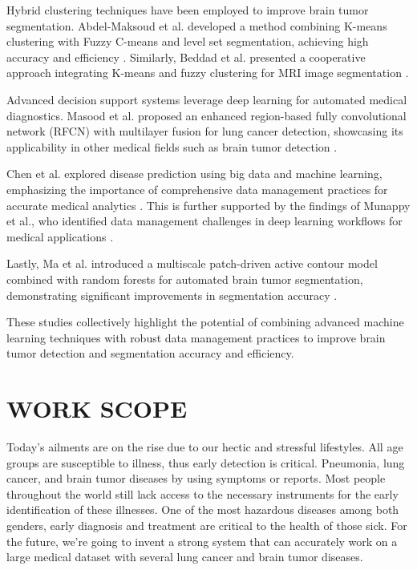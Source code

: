 \documentclass[conference]{IEEEtran}
\begin{document}
Hybrid clustering techniques have been employed to improve brain tumor segmentation. Abdel-Maksoud et al. developed a method combining K-means clustering with Fuzzy C-means and level set segmentation, achieving high accuracy and efficiency \cite{ABDELMAKSOUD201571-51}. Similarly, Beddad et al. presented a cooperative approach integrating K-means and fuzzy clustering for MRI image segmentation \cite{dattaad:10.1504}.

Advanced decision support systems leverage deep learning for automated medical diagnostics. Masood et al. proposed an enhanced region-based fully convolutional network (RFCN) with multilayer fusion for lung cancer detection, showcasing its applicability in other medical fields such as brain tumor detection \cite{masood900}. 

Chen et al. explored disease prediction using big data and machine learning, emphasizing the importance of comprehensive data management practices for accurate medical analytics \cite{chen791-53}. This is further supported by the findings of Munappy et al., who identified data management challenges in deep learning workflows for medical applications \cite{munppy89-16}.

Lastly, Ma et al. introduced a multiscale patch-driven active contour model combined with random forests for automated brain tumor segmentation, demonstrating significant improvements in segmentation accuracy \cite{ma82}.

These studies collectively highlight the potential of combining advanced machine learning techniques with robust data management practices to improve brain tumor detection and segmentation accuracy and efficiency.

\section{WORK SCOPE}
 Today's ailments are on the rise due to our hectic and stressful lifestyles. All age groups are susceptible to illness, thus early detection is critical. Pneumonia, lung cancer, and brain tumor diseases by using symptoms or reports. Most people throughout the world still lack access to the necessary instruments for the early identification of these illnesses. One of the most hazardous diseases among both genders, early diagnosis and treatment are critical to the health of those sick. For the future, we're going to invent a strong system that can accurately work on a large medical dataset with several lung cancer and brain tumor diseases.
 
\end{document}
